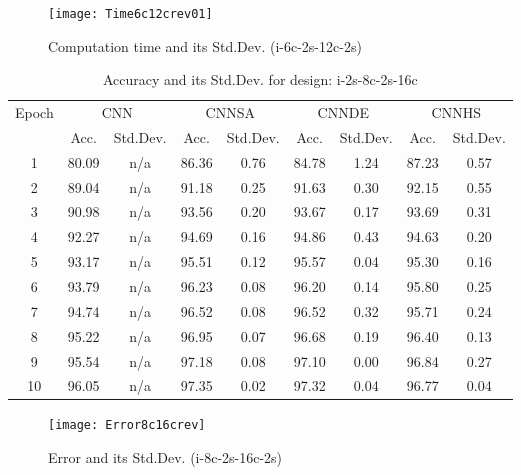 \documentclass[10pt,letterpaper]{article}
\begin{document}
\begin{figure}
    \texttt{[image: Time6c12crev01]}
    \caption{Computation time and its Std.Dev. (i-6c-2s-12c-2s)}
    \label{fig:my_label}
\end{figure}


\begin{table}[]
\small
\caption{Accuracy and its Std.Dev. for design: i-2s-8c-2s-16c}
\label{tab:my_label}

\begin{tabular}{c c c c c c c c c}
\hline
\multicolumn{1}{c}{\multirow{2}{*}{Epoch}} & \multicolumn{2}{c}{CNN} &
\multicolumn{2}{c}{CNNSA} & \multicolumn{2}{c}{CNNDE} & \multicolumn{2}{c}{CNNHS}\\
\cline{2-9}

\multicolumn{1}{r}{}       & \multicolumn{1}{c}{Acc.} & \multicolumn{1}{c}{Std.Dev.} &
\multicolumn{1}{c}{Acc.} & \multicolumn{1}{c}{Std.Dev.}  & \multicolumn{1}{c}{Acc.} &
\multicolumn{1}{c}{Std.Dev.} & \multicolumn{1}{c}{Acc.} & \multicolumn{1}{c}{Std.Dev.} \\
\hline

1		& 80.09 & n/a	 & 86.36 & 0.76	  & 84.78 & 1.24    & 87.23  & 0.57  \\
2 		& 89.04 & n/a	 & 91.18 & 0.25	  & 91.63 & 0.30    & 92.15  & 0.55  \\
3		& 90.98 & n/a	 & 93.56 & 0.20	  & 93.67 & 0.17  	& 93.69  & 0.31  \\
4		& 92.27 & n/a	 & 94.69 & 0.16	  & 94.86 & 0.43 	& 94.63  & 0.20  \\
5		& 93.17	& n/a    & 95.51 & 0.12	  & 95.57 & 0.04    & 95.30  & 0.16 \\
6		& 93.79 & n/a	 & 96.23 & 0.08   & 96.20 & 0.14  	& 95.80  & 0.25 \\
7 		& 94.74	& n/a    & 96.52 & 0.08   & 96.52 & 0.32    & 95.71  & 0.24 \\
8		& 95.22 & n/a	 & 96.95 & 0.07	  & 96.68 & 0.19 	& 96.40  & 0.13 \\
9		& 95.54 & n/a	 & 97.18 & 0.08   & 97.10 & 0.00 	& 96.84  & 0.27 \\
10		& 96.05 & n/a	 & 97.35 & 0.02	  & 97.32 & 0.04	& 96.77  & 0.04 \\

\hline
\end{tabular}
\end{table}



\begin{figure}
    \texttt{[image: Error8c16crev]}
    \caption{Error and its Std.Dev. (i-8c-2s-16c-2s) }
    \label{fig:my_label}
\end{figure}
\end{document}
